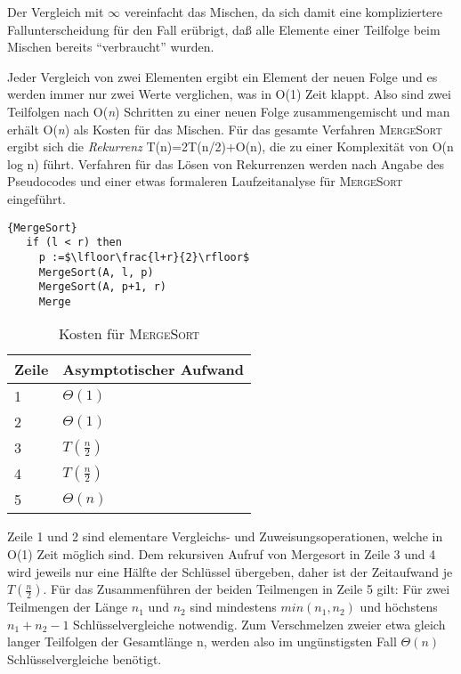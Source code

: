 \documentclass[ngerman]{scrreprt}%
\theoremstyle{break}
\begin{document}
Der Vergleich mit $\infty$ vereinfacht das Mischen, da sich damit eine kompliziertere Fallunterscheidung für den Fall erübrigt, 
daß alle Elemente einer Teilfolge beim Mischen bereits "`verbraucht"' wurden.

Jeder Vergleich von zwei Elementen ergibt ein Element der neuen Folge und es werden immer nur zwei Werte verglichen, was in
O(1) Zeit klappt. Also sind zwei Teilfolgen nach O(\textit{n}) Schritten zu einer neuen Folge zusammengemischt und man erhält
O(\textit{n}) als Kosten für das Mischen.
Für das gesamte Verfahren \textsc{MergeSort} ergibt sich die \textit{Rekurrenz} T(n)=2T(n/2)+O(n), die zu einer Komplexität von O(n
log n) führt. Verfahren für das Lösen von Rekurrenzen werden nach Angabe des Pseudocodes und einer etwas
formaleren Laufzeitanalyse für \textsc{MergeSort} eingeführt.

%
\begin{Algorithmus}[h]
    \begin{lstlisting}[frame=tlrb, mathescape=true, title=\textsc{MergeSort}, gobble=3]{MergeSort}   
   if (l < r) then
     p :=$\lfloor\frac{l+r}{2}\rfloor$ 
     MergeSort(A, l, p)
     MergeSort(A, p+1, r)
     Merge
    \end{lstlisting}
  \end{Algorithmus}
  
\begin{table}[h]
  \begin{tabular}{*{2}{l}}
    Zeile & Asymptotischer Aufwand\\
    \hline
    1 & $\Theta(1)$\\
    2 & $\Theta(1)$\\
    3 & $T(\frac{n}{2})$\\
    4 & $T(\frac{n}{2})$\\
    5 & $\Theta(n)$\\
  \end{tabular}
  \caption{Kosten für \textsc{MergeSort}} 
\end{table}

Zeile 1 und 2 sind elementare Vergleichs- und Zuweisungsoperationen, welche in O(1) Zeit möglich sind. 
Dem rekursiven Aufruf von Mergesort in Zeile 3 und 4 wird jeweils nur eine Hälfte der Schlüssel übergeben, 
daher ist der Zeitaufwand je $T(\frac{n}{2})$. Für das Zusammenführen der beiden Teilmengen in Zeile 5 gilt: 
Für zwei Teilmengen der Länge $n_1$ und $n_2$ sind mindestens $min(n_1,n_2)$ und höchstens $n_1 + n_2 -1$ Schlüsselvergleiche notwendig. 
Zum Verschmelzen zweier etwa gleich langer Teilfolgen der Gesamtlänge n, werden also im ungünstigsten Fall $\Theta(n)$ Schlüsselvergleiche benötigt.
\end{document}
